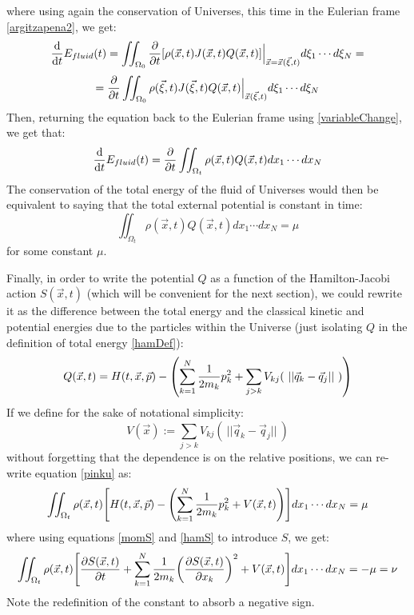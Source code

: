 \documentclass[11pt, a4paper]{article} %
\begin{document}
where using again the conservation of Universes, this time in the Eulerian frame \eqref{argitzapena2}, we get:
\begin{equation}
\dv{}{t}E_{fluid}(t)=\iint_{\Omega_0}\pdv{}{t}\qty[ \rho(\vec{x},t)J(\vec{x},t)Q(\vec{x},t)]\Big\rvert_{\vec{x}=\vec{x}(\vec{\xi},t)}d\xi_1\cdots d\xi_N=
\end{equation}
$$
=\pdv{}{t}\iint_{\Omega_0}\rho(\vec{\xi},t)J(\vec{\xi},t)Q(\vec{x},t)\Big\rvert_{\vec{x}(\vec{\xi},t)}d\xi_1\cdots d\xi_N
$$
Then, returning the equation back to the Eulerian frame using \eqref{variableChange}, we get that:
\begin{equation}
\dv{}{t}E_{fluid}(t)=\pdv{}{t}\iint_{\Omega_t} \rho(\vec{x},t)Q(\vec{x},t)dx_1\cdots dx_N
\end{equation}
The conservation of the total energy of the fluid of Universes would then be equivalent to saying that the total external potential is constant in time:
\begin{equation}\label{pinku}
\iint_{\Omega_t} \rho(\vec{x},t)Q(\vec{x},t)dx_1\cdots dx_N=\mu
\end{equation}
for some constant $\mu$.

Finally, in order to write the potential $Q$ as a function of the Hamilton-Jacobi action $S(\vec{x},t)$ (which will be convenient for the next section), we could rewrite it as the difference between the total energy and the classical kinetic and potential energies due to the particles within the Universe (just isolating $Q$ in the definition of total energy \eqref{hamDef}):
\begin{equation}
Q(\vec{x},t)=H(t, \vec{x},\vec{p})-\qty(\sum_{k=1}^N\frac{1}{2m_k}p_k^2+\sum_{j>k} V_{kj}(\ ||\vec{q}_k-\vec{q}_j||\ ))
\end{equation}
If we define for the sake of notational simplicity:
\begin{equation}
V(\vec{x}):=\sum_{j>k} V_{kj}(\ ||\vec{q}_k-\vec{q}_j||\ )
\end{equation}
without forgetting that the dependence is on the relative positions, we can re-write equation \eqref{pinku} as:
\begin{equation}
\iint_{\Omega_t} \rho(\vec{x},t)\qty[H(t,\vec{x},\vec{p})-\qty(\sum_{k=1}^N \frac{1}{2m_k}p_k^2+V(\vec{x},t))]dx_1\cdots dx_N=\mu
\end{equation}
where using equations \eqref{momS} and \eqref{hamS} to introduce $S$, we get:
\begin{equation}\label{baai}
\iint_{\Omega_t} \rho(\vec{x},t)\qty[\pdv{S(\vec{x},t)}{t}+\sum_{k=1}^N \frac{1}{2m_k}\qty(\pdv{S(\vec{x},t)}{x_k})^2+V(\vec{x},t)]dx_1\cdots dx_N=-\mu=\nu
\end{equation}
Note the redefinition of the constant to absorb a negative sign.
\end{document}
